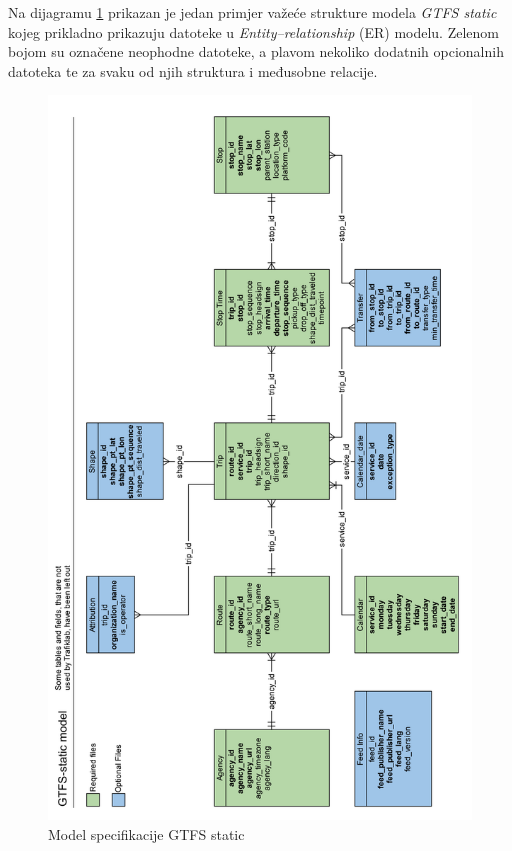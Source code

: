 \documentclass[zavrsnirad]{fer}
\begin{document}
Na dijagramu \ref{slk:gtfs-model} prikazan je jedan primjer važeće strukture  modela \textit{GTFS static} kojeg prikladno prikazuju datoteke u \textit{Entity–relationship} (ER) modelu. Zelenom bojom su označene neophodne datoteke, a plavom nekoliko dodatnih opcionalnih datoteka te za svaku od njih struktura i međusobne relacije. 

\begin{figure}[H]
	\centering
	\includegraphics[width=\linewidth-30pt]{Figures/gtfs-model.png}
	\caption{Model specifikacije GTFS static \cite{GTFS-schedule-model}}
	\label{slk:gtfs-model}
\end{figure}
\end{document}
